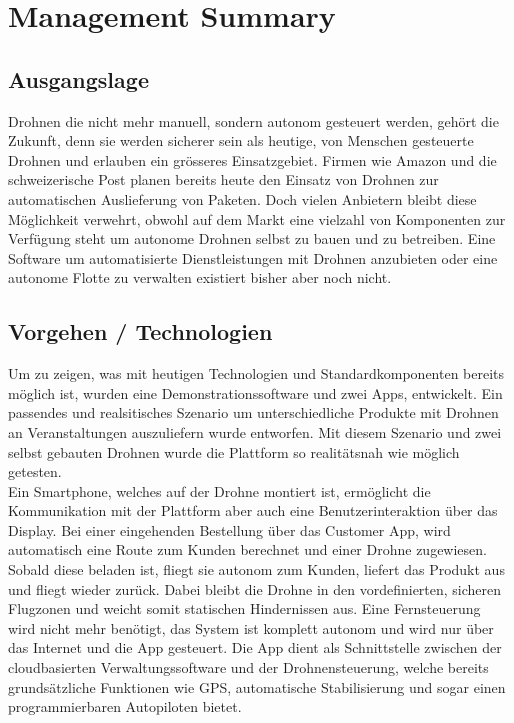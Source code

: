 \newpage
{}
\chapter*{Management Summary}
\section*{Ausgangslage}
Drohnen die nicht mehr manuell, sondern autonom gesteuert werden, gehört die Zukunft, denn sie werden sicherer sein als heutige, von Menschen gesteuerte Drohnen und erlauben ein grösseres Einsatzgebiet. Firmen wie Amazon und die schweizerische Post planen bereits heute den Einsatz von Drohnen zur automatischen Auslieferung von Paketen. Doch vielen Anbietern bleibt diese Möglichkeit verwehrt, obwohl auf dem Markt eine vielzahl von Komponenten zur Verfügung steht um autonome Drohnen selbst zu bauen und zu betreiben. Eine Software um automatisierte Dienstleistungen mit Drohnen anzubieten oder eine autonome Flotte zu verwalten existiert bisher aber noch nicht.

\section*{Vorgehen / Technologien}
Um zu zeigen, was mit heutigen Technologien und Standardkomponenten bereits möglich ist, wurden eine Demonstrationssoftware und zwei Apps, entwickelt. Ein passendes und realsitisches Szenario um unterschiedliche Produkte mit Drohnen an Veranstaltungen auszuliefern wurde entworfen. Mit diesem Szenario und zwei selbst gebauten Drohnen wurde die Plattform so realitätsnah wie möglich getesten.  \\

Ein Smartphone, welches auf der Drohne montiert ist, ermöglicht die Kommunikation mit der Plattform aber auch eine Benutzerinteraktion über das Display. Bei einer eingehenden Bestellung über das Customer App, wird automatisch eine Route zum Kunden berechnet und einer Drohne zugewiesen. Sobald diese beladen ist, fliegt sie autonom zum Kunden, liefert das Produkt aus und fliegt wieder zurück. Dabei bleibt die Drohne in den vordefinierten, sicheren Flugzonen und weicht somit statischen Hindernissen aus. Eine Fernsteuerung wird nicht mehr benötigt, das System ist komplett autonom und wird nur über das Internet und die App gesteuert. Die App dient als Schnittstelle zwischen der cloudbasierten Verwaltungssoftware und der Drohnensteuerung, welche bereits grundsätzliche Funktionen wie GPS, automatische Stabilisierung und sogar einen programmierbaren Autopiloten bietet.

